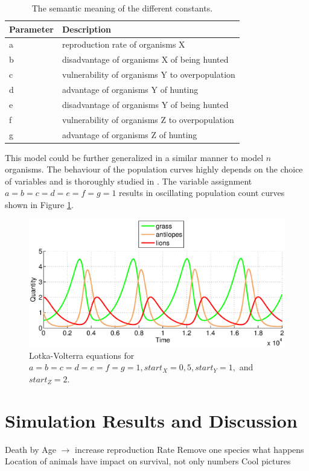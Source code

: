 \documentclass[11pt]{article}
\begin{document}
\begin{table}[htbp]
\centering
\begin{tabular}{l|l}
Parameter & Description \\ 
\hline 
\hline 
a & reproduction rate of organisms X\\ 
\hline 
b & disadvantage of organisms X of being hunted\\ 
\hline 
c & vulnerability of organisms Y to overpopulation\\  
\hline 
d & advantage of organisms Y of hunting\\
\hline 
e & disadvantage of organisms Y of being hunted\\
\hline 
f & vulnerability of organisms Z to overpopulation\\
\hline 
g & advantage of organisms Z of hunting\\
\end{tabular}
\caption{The semantic meaning of the different constants.}
\label{tab:LotkaVolterraParameters}
\end{table}

This model could be further generalized in a similar manner to model $n$ organisms. The behaviour of the population curves highly depends on the choice of variables and is thoroughly studied in \cite{lotkaVolterraThreeSpecies}. The variable assignment $a=b=c=d=e=f=g=1$ results in oscillating population count curves shown in Figure \ref{fig:LotkaVolterraThreeAllOnes}. 

\begin{figure}
\centering
\includegraphics[scale=0.65]{LotkaVolterraThreeAllOnes.eps}
\caption{Lotka-Volterra equations for $a=b=c=d=e=f=g=1,start_X=0,5, start_Y=1,$ and $start_Z=2$.}
\label{fig:LotkaVolterraThreeAllOnes}
\end{figure}

\section{Simulation Results and Discussion}
Death by Age $\rightarrow$ increase reproduction Rate
Remove one species what happens
Location of animals have impact on survival, not only numbers
Cool pictures
\end{document}
